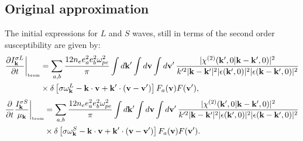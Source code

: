\documentclass[12pt,a4paper,ruledheader]{report}
\begin{document}
\begin{appendix}
\section{Original approximation}
\label{sec:orig-appr}
The initial expressions for $L$ and $S$ waves, still in terms of the
second order susceptibility are given by:
\begin{equation}
\label{PkL-A}
  \begin{split}
    \frac{\partial I_{\bf k}^{\sigma L}}{\partial t}\biggr|_{\mbox{\tiny brem}}&=\sum_{a,b}
\frac{12n_ee_a^2e_b^2\omega_{pe}^2}{\pi}\int d{\bf k}'\int d{\bf v}\int d{\bf v}'
\,\frac{|\chi^{(2)}({\bf k}',0|{\bf k}-{\bf k}',0)|^2}{k'^2|{\bf k}-{\bf k}'|^2
|\epsilon({\bf k}',0)|^2|\epsilon({\bf k}-{\bf k}',0)|^2}\\
&\times\delta\left[\sigma\omega_{\bf k}^L-{\bf k}\cdot{\bf v}+{\bf k}'\cdot
  ({\bf v}-{\bf v}')\right]F_a({\bf v})F({\bf v}'),
\end{split}
\end{equation}
\begin{equation}
     \label{PkS-A}
  \begin{split}
 \frac{\partial}{\partial t}
\frac{I_{\bf k}^{\sigma S}}{\mu_{\bf k}}\biggr|_{\mbox{\tiny brem}}&=\sum_{a,b}
\frac{12n_ee_a^2e_b^2\omega_{pe}^2}{\pi}
\int d{\bf k}'\int d{\bf v}\int d{\bf v}'
\,\frac{|\chi^{(2)}({\bf k}',0|{\bf k}-{\bf k}',0)|^2}{k'^2|{\bf k}-{\bf k}'|^2
|\epsilon({\bf k}',0)|^2|\epsilon({\bf k}-{\bf k}',0)|^2}\\
&\times\delta\left[\sigma\omega_{\bf k}^S-{\bf k}\cdot{\bf v}+{\bf k}'\cdot
  ({\bf v}-{\bf v}')\right]F_a({\bf v})F({\bf v}').
  \end{split}
\end{equation}


\end{appendix}
\end{document}
